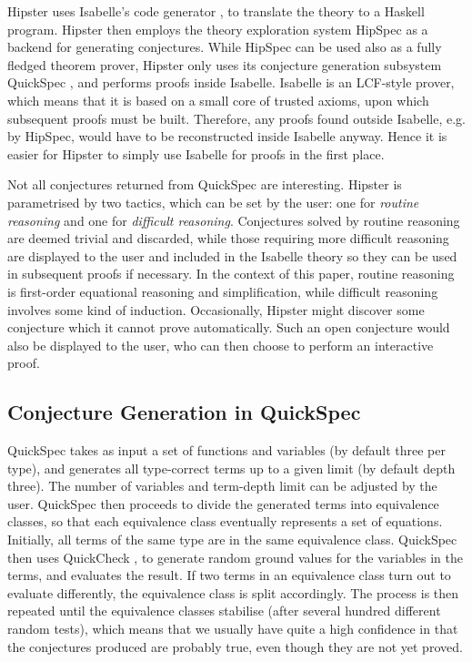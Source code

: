 Hipster uses Isabelle's code generator \cite{codegen2}, to translate the theory to a Haskell program. Hipster then employs the theory exploration system HipSpec as a backend for generating conjectures. While HipSpec can be used also as a fully fledged theorem prover, Hipster only uses its conjecture generation subsystem QuickSpec \cite{quickspec}, and performs proofs inside Isabelle. Isabelle is an LCF-style prover, which means that it is based on a small core of trusted axioms, upon which subsequent proofs must be built. Therefore, any proofs found outside Isabelle, e.g. by HipSpec, would have to be reconstructed inside Isabelle anyway. Hence it is easier for Hipster to simply use Isabelle for proofs in the first place. 

Not all conjectures returned from QuickSpec are interesting. Hipster is parametrised by two tactics, which can be set by the user: one for \emph{routine reasoning} and one for \emph{difficult reasoning}. Conjectures solved by routine reasoning are deemed trivial and discarded, while those requiring more difficult reasoning are displayed to the user and included in the Isabelle theory so they can be used in subsequent proofs if necessary. In the context of this paper, routine reasoning is first-order equational reasoning and simplification, while difficult reasoning involves some kind of induction. Occasionally, Hipster might discover some conjecture which it cannot prove automatically. Such an open conjecture would also be displayed to the user, who can then choose to perform an interactive proof.

\subsection{Conjecture Generation in QuickSpec}
QuickSpec takes as input a set of functions and variables (by default three per type), and generates all type-correct terms up to a given limit (by default depth three). The number of variables and term-depth limit can be adjusted by the user. QuickSpec then proceeds to divide the generated terms into equivalence classes, so that each equivalence class eventually represents a set of equations. Initially, all terms of the same type are in the same equivalence class. QuickSpec then uses QuickCheck \cite{quickcheck}, to generate random ground values for the variables in the terms, and evaluates the result. If two terms in an equivalence class turn out to evaluate differently, the equivalence class is split accordingly. The process is then repeated until the equivalence classes stabilise (after several hundred different random tests), which means that we usually have quite a high confidence in that the conjectures produced are probably true, even though they are not yet proved.  


